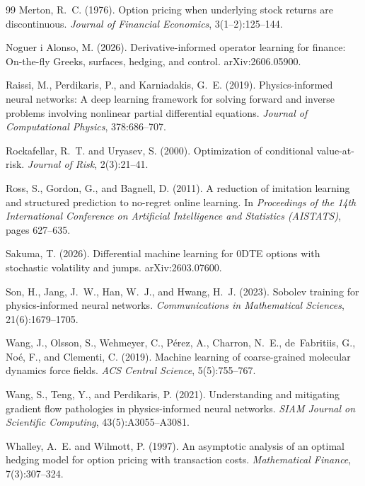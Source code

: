 \documentclass{article}
\begin{document}
\begin{thebibliography}{99}
Merton, R.~C. (1976).
\newblock Option pricing when underlying stock returns are discontinuous.
\newblock \emph{Journal of Financial Economics}, 3(1--2):125--144.
 
 
Noguer i Alonso, M. (2026).
\newblock Derivative-informed operator learning for finance: On-the-fly Greeks,
surfaces, hedging, and control.
\newblock arXiv:2606.05900.
 
Raissi, M., Perdikaris, P., and Karniadakis, G.~E. (2019).
\newblock Physics-informed neural networks: A deep learning framework for solving
forward and inverse problems involving nonlinear partial differential equations.
\newblock \emph{Journal of Computational Physics}, 378:686--707.
 
Rockafellar, R.~T. and Uryasev, S. (2000).
\newblock Optimization of conditional value-at-risk.
\newblock \emph{Journal of Risk}, 2(3):21--41.
 
Ross, S., Gordon, G., and Bagnell, D. (2011).
\newblock A reduction of imitation learning and structured prediction to no-regret
online learning.
\newblock In \emph{Proceedings of the 14th International Conference on Artificial
Intelligence and Statistics (AISTATS)}, pages 627--635.
 
Sakuma, T. (2026).
\newblock Differential machine learning for 0DTE options with stochastic
volatility and jumps.
\newblock arXiv:2603.07600.
 
Son, H., Jang, J.~W., Han, W.~J., and Hwang, H.~J. (2023).
\newblock Sobolev training for physics-informed neural networks.
\newblock \emph{Communications in Mathematical Sciences}, 21(6):1679--1705.
 
Wang, J., Olsson, S., Wehmeyer, C., P\'erez, A., Charron, N.~E., de~Fabritiis, G.,
No\'e, F., and Clementi, C. (2019).
\newblock Machine learning of coarse-grained molecular dynamics force fields.
\newblock \emph{ACS Central Science}, 5(5):755--767.
 
Wang, S., Teng, Y., and Perdikaris, P. (2021).
\newblock Understanding and mitigating gradient flow pathologies in
physics-informed neural networks.
\newblock \emph{SIAM Journal on Scientific Computing}, 43(5):A3055--A3081.
 
Whalley, A.~E. and Wilmott, P. (1997).
\newblock An asymptotic analysis of an optimal hedging model for option pricing
with transaction costs.
\newblock \emph{Mathematical Finance}, 7(3):307--324.
 
\end{thebibliography}
\end{document}
